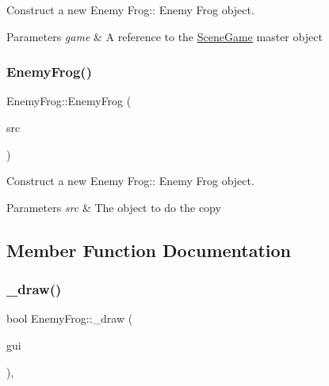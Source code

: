 Construct a new Enemy Frog\+:\+: Enemy Frog object. 


\begin{DoxyParams}{Parameters}
{\em game} & A reference to the \hyperlink{class_scene_game}{Scene\+Game} master object \\
\hline
\end{DoxyParams}
\mbox{\label{class_enemy_frog_a5d3df45d73db5bcb2320e3a3b2e21d9a}} 
\subsubsection{\texorpdfstring{Enemy\+Frog()}{EnemyFrog()}\hspace{0.1cm}{\footnotesize\ttfamily [2/2]}}
{\footnotesize\ttfamily Enemy\+Frog\+::\+Enemy\+Frog (\begin{DoxyParamCaption}\item[{\hyperlink{class_enemy_frog}{Enemy\+Frog} const \&}]{src }\end{DoxyParamCaption})}



Construct a new Enemy Frog\+:\+: Enemy Frog object. 


\begin{DoxyParams}{Parameters}
{\em src} & The object to do the copy \\
\hline
\end{DoxyParams}


\subsection{Member Function Documentation}
\mbox{\label{class_enemy_frog_a2cf685062369505da75844967e16d344}} 
\subsubsection{\texorpdfstring{\+\_\+draw()}{\_draw()}}
{\footnotesize\ttfamily bool Enemy\+Frog\+::\+\_\+draw (\begin{DoxyParamCaption}\item[{\hyperlink{class_gui}{Gui} \&}]{gui }\end{DoxyParamCaption})\hspace{0.3cm}{\ttfamily [protected]}, {\ttfamily [virtual]}}



